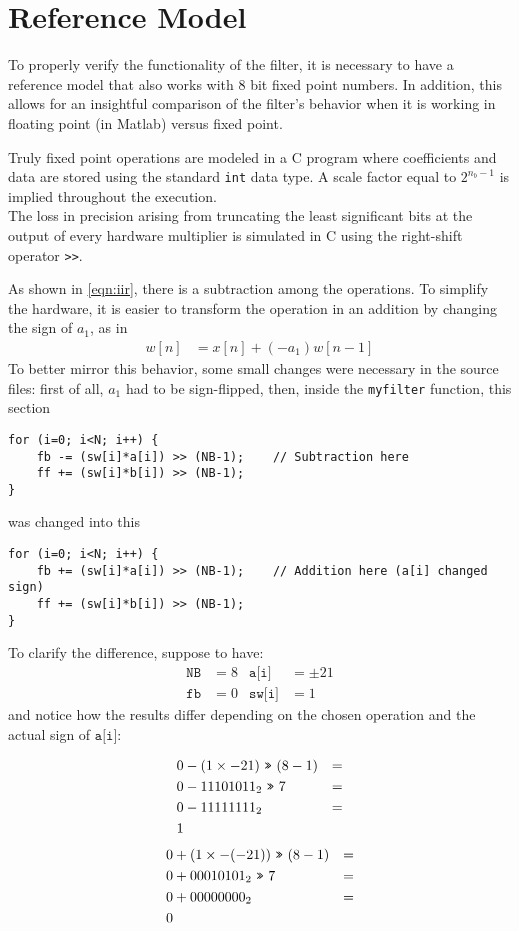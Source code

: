 \section{Reference Model}
To properly verify the functionality of the filter, it is necessary to have a reference model that also works with 8 bit fixed point numbers. In addition, this allows for an insightful comparison of the filter's behavior when it is working in floating point (in Matlab) versus fixed point.


Truly fixed point operations are modeled in a C program where coefficients and data are stored using the standard \texttt{int} data type. A scale factor equal to $2^{n_b-1}$ is implied throughout the execution.\\
The loss in precision arising from truncating the least significant bits at the output of every hardware multiplier is simulated in C using the right-shift operator \texttt{>>}.

As shown in \autoref{eqn:iir}, there is a subtraction among the operations. To simplify the hardware, it is easier to transform the operation in an addition by changing the sign of $a_1$, as in
\begin{align}
	w[n] &= x[n] + (- a_1) w[n-1]
\end{align}
To better mirror this behavior, some small changes were necessary in the source files: first of all, $a_1$ had to be sign-flipped, then, inside the \texttt{myfilter} function, this section
\begin{Verbatim}
for (i=0; i<N; i++) {
	fb -= (sw[i]*a[i]) >> (NB-1);    // Subtraction here
	ff += (sw[i]*b[i]) >> (NB-1);
}
\end{Verbatim}
was changed into this
\begin{Verbatim}
for (i=0; i<N; i++) {
	fb += (sw[i]*a[i]) >> (NB-1);    // Addition here (a[i] changed sign)
	ff += (sw[i]*b[i]) >> (NB-1);
}
\end{Verbatim}
To clarify the difference, suppose to have:
\begin{align*}
	\texttt{NB} &= 8 & \texttt{a[i]} &= \pm21 \\
	\texttt{fb} &= 0 & \texttt{sw[i]} &= 1
\end{align*}
and notice how the results differ depending on the chosen operation and the actual sign of $\texttt{a[i]}$:
\setlength{\columnseprule}{0.4pt}
\begin{multicols}{2}
	\noindent
	\begin{align*}
		0 &- (1 \times -21) \ \texttt{>>}\  (8 - 1) &= \\
		0 &- 11101011_2 \ \texttt{>>}\  7 &= \\
		0 &- 11111111_2 &= \\
		1&
	\end{align*}
	\begin{align*}
		0 &+ (1 \times -(-21)) \ \texttt{>>}\  (8 - 1) &= \\
		0 &+ 00010101_2 \ \texttt{>>}\  7 &= \\
		0 &+ 00000000_2 &= \\
		0&
	\end{align*}
\end{multicols}
